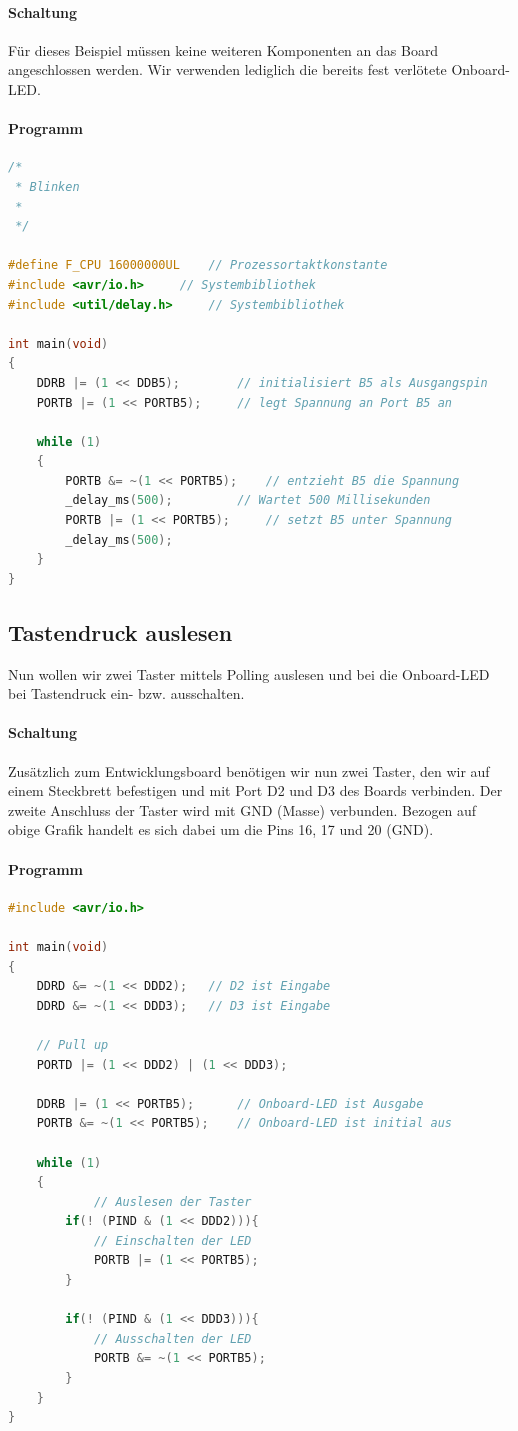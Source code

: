 \documentclass[11pt,a4paper]{scrartcl}
\begin{document}
\paragraph{Schaltung} Für dieses Beispiel müssen keine weiteren Komponenten an das Board angeschlossen werden. Wir verwenden lediglich die bereits fest verlötete Onboard-LED.
\paragraph{Programm} \quad
\begin{lstlisting}[language=C]
/*
 * Blinken
 *	
 */ 

#define F_CPU 16000000UL	// Prozessortaktkonstante
#include <avr/io.h>		// Systembibliothek
#include <util/delay.h>		// Systembibliothek

int main(void)
{
	DDRB |= (1 << DDB5);		// initialisiert B5 als Ausgangspin
	PORTB |= (1 << PORTB5);		// legt Spannung an Port B5 an
	
	while (1) 
	{
		PORTB &= ~(1 << PORTB5);	// entzieht B5 die Spannung
		_delay_ms(500);			// Wartet 500 Millisekunden
		PORTB |= (1 << PORTB5);		// setzt B5 unter Spannung
		_delay_ms(500);
	}
}
\end{lstlisting}
\subsection{Tastendruck auslesen}
Nun wollen wir zwei Taster mittels Polling auslesen und bei die Onboard-LED bei Tastendruck ein- bzw. ausschalten.
\paragraph{Schaltung} Zusätzlich zum Entwicklungsboard benötigen wir nun zwei Taster, den wir auf einem Steckbrett befestigen und mit Port D2 und D3 des Boards verbinden. Der zweite Anschluss der Taster wird mit GND (Masse) verbunden. Bezogen auf obige Grafik handelt es sich dabei um die Pins 16, 17 und 20 (GND).
\paragraph{Programm} \quad
\begin{lstlisting}[language=C]
#include <avr/io.h>

int main(void)
{
	DDRD &= ~(1 << DDD2);	// D2 ist Eingabe
	DDRD &= ~(1 << DDD3);	// D3 ist Eingabe
	
	// Pull up
	PORTD |= (1 << DDD2) | (1 << DDD3);
	
	DDRB |= (1 << PORTB5);		// Onboard-LED ist Ausgabe
	PORTB &= ~(1 << PORTB5);	// Onboard-LED ist initial aus
	
    while (1) 
    {
    		// Auslesen der Taster
		if(! (PIND & (1 << DDD2))){
			// Einschalten der LED			
			PORTB |= (1 << PORTB5);
		}
		
		if(! (PIND & (1 << DDD3))){
			// Ausschalten der LED			
			PORTB &= ~(1 << PORTB5);
		}
    }
}

\end{lstlisting}
\end{document}
